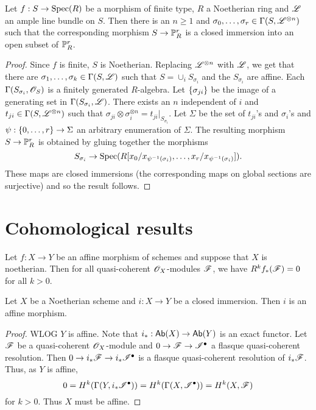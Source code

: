 \documentclass{memoir}
\begin{document}
\begin{thm}
    Let $f:S\to \Spec(R)$ be a morphism of finite type, $R$ a Noetherian ring and $\shf L$ an ample line bundle on $S$.
    Then there is an $n\ge 1$ and $\sigma_0,\dots,\sigma_r\in \Gamma(S,\shf L^{\otimes n})$ such that the corresponding morphism $S\to \P^r_R$ is a closed immersion into an open subset of $\P^r_R$.
\end{thm}
\begin{proof}
    Since $f$ is finite, $S$ is Noetherian.
    Replacing $\shf L^{\otimes n}$ with $\shf L$, we get that there are $\sigma_1,\dots,\sigma_k\in \Gamma(S,\shf L)$ such that $S = \cup_iS_{\sigma_i}$ and the $S_{\sigma_i}$ are affine.
    Each $\Gamma(S_{\sigma_i},\shf O_S)$ is a finitely generated $R$-algebra.
    Let $\set{\sigma_{ji}}$ be the image of a generating set in $\Gamma(S_{\sigma_i},\shf L)$.
    There exists an $n$ independent of $i$ and $t_{ji}\in \Gamma(S,\shf L^{\otimes n})$ such that $\sigma_{ji}\otimes \sigma_i^{\otimes n} = t_{ji}|_{S_{\sigma_i}}$.
    Let $\Sigma$ be the set of $t_{ji}$'s and $\sigma_i$'s and $\psi:\set{0,\dots,r}\to \Sigma$ an arbitrary enumeration of $\Sigma$.
    The resulting morphism $S\to \P^r_R$ is obtained by gluing together the morphisms
    \begin{equation}
        S_{\sigma_i} \to \Spec(R[x_0/x_{\psi^{-1}(\sigma_i)},\dots,x_r/x_{\psi^{-1}(\sigma_i)}]).
    \end{equation}
    These maps are closed immersions (the corresponding maps on global sections are surjective) and so the result follows.
\end{proof}
\section{Cohomological results}
\begin{lemma}
    Let $f:X\to Y$ be an affine morphism of schemes and suppose that $X$ is noetherian.
    Then for all quasi-coherent $\shf O_X$-modules $\shf F$, we have $R^kf_*(\shf F) = 0$ for all $k>0$.
\end{lemma}
\begin{lemma}
    Let $X$ be a Noetherian scheme and $i:X\to Y$ be a closed immersion.
    Then $i$ is an affine morphism.
\end{lemma}
\begin{proof}
    WLOG $Y$ is affine.
    Note that $i_*:\Ab(X)\to \Ab(Y)$ is an exact functor.
    Let $\shf F$ be a quasi-coherent $\shf O_X$-module and $0\to \shf F\to \shf I^\bullet$ a flasque quasi-coherent resolution.
    Then $0 \to i_*\shf F\to i_*\shf I^\bullet$ is a flasque quasi-coherent resolution of $i_*\shf F$.
    Thus, as $Y$ is affine,
    \begin{equation}
        0 = H^k(\Gamma(Y,i_*\shf I^\bullet)) = H^k(\Gamma(X,\shf I^\bullet)) = H^k(X,\shf F)
    \end{equation}
    for $k>0$.
    Thus $X$ must be affine.
\end{proof}
\end{document}
